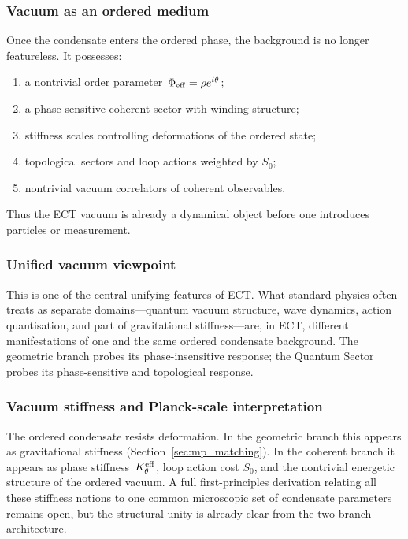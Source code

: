 \subsubsection*{Vacuum as an ordered medium}

Once the condensate enters the ordered phase, the background is no
longer featureless.
It possesses:
\begin{enumerate}[label=(\roman*)]
  \item a nontrivial order parameter~$\Phi_{\rm eff}=\rho e^{i\theta}$;
  \item a phase-sensitive coherent sector with winding structure;
  \item stiffness scales controlling deformations of the ordered state;
  \item topological sectors and loop actions weighted by $S_0$;
  \item nontrivial vacuum correlators of coherent observables.
\end{enumerate}
Thus the ECT vacuum is already a dynamical object before one introduces
particles or measurement.

\subsubsection*{Unified vacuum viewpoint}

This is one of the central unifying features of ECT.
What standard physics often treats as separate domains---quantum vacuum
structure, wave dynamics, action quantisation, and part of
gravitational stiffness---are, in ECT, different manifestations of one
and the same ordered condensate background.
The geometric branch probes its phase-insensitive response;
the Quantum Sector probes its phase-sensitive and topological response.

\subsubsection*{Vacuum stiffness and Planck-scale interpretation}

The ordered condensate resists deformation.
In the geometric branch this appears as gravitational stiffness
(Section~\ref{sec:mp_matching}).
In the coherent branch it appears as phase stiffness~$K_\theta^{\rm eff}$,
loop action cost $S_0$, and the nontrivial energetic structure of the
ordered vacuum.
A full first-principles derivation relating all these stiffness notions
to one common microscopic set of condensate parameters remains open,
but the structural unity is already clear from the two-branch
architecture.

